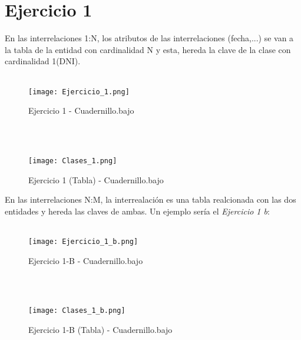 \documentclass{article}
\begin{document}
\newpage
\section{Ejercicio 1}
En las interrelaciones 1:N, los atributos de las interrelaciones (fecha,...) se van a la tabla de la entidad con cardinalidad N y  esta, hereda la clave de la clase con cardinalidad 1(DNI).
\\
\\
\begin{figure}[h]
        
    \centering
    \texttt{[image: Ejercicio\_1.png]}
    \caption{Ejercicio 1 - Cuadernillo.bajo}

\end{figure}
\\
\\
\begin{figure}[h]
        
    \centering
    \texttt{[image: Clases\_1.png]}
    \caption{Ejercicio 1 (Tabla) - Cuadernillo.bajo}

\end{figure}
\newpage
En las interrelaciones N:M, la interrealación es una tabla realcionada con las dos entidades y hereda las claves de ambas. Un ejemplo sería el \textit{Ejercicio 1 b}:
\\
\\
\begin{figure}[h]
        
    \centering
    \texttt{[image: Ejercicio\_1\_b.png]}
    \caption{Ejercicio 1-B - Cuadernillo.bajo}

\end{figure}
\\
\\
\begin{figure}[h]
        
    \centering
    \texttt{[image: Clases\_1\_b.png]}
    \caption{Ejercicio 1-B (Tabla) - Cuadernillo.bajo}

\end{figure}
\end{document}
